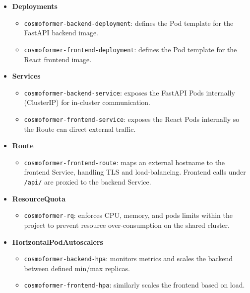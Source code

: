 \begin{itemize}
  \item \textbf{Deployments}
    \begin{itemize}
      \item \texttt{cosmoformer-backend-deployment}: defines the Pod template for the FastAPI backend image.
      \item \texttt{cosmoformer-frontend-deployment}: defines the Pod template for the React frontend image.
    \end{itemize}
    
  \item \textbf{Services}
    \begin{itemize}
      \item \texttt{cosmoformer-backend-service}: exposes the FastAPI Pods internally (ClusterIP) for in-cluster communication.
      \item \texttt{cosmoformer-frontend-service}: exposes the React Pods internally so the Route can direct external traffic.
    \end{itemize}

  \item \textbf{Route}
    \begin{itemize}
      \item \texttt{cosmoformer-frontend-route}: maps an external hostname to the frontend Service, handling TLS and load-balancing. Frontend calls under \texttt{/api/} are proxied to the backend Service.
    \end{itemize}

  \item \textbf{ResourceQuota}
    \begin{itemize}
      \item \texttt{cosmoformer-rq}: enforces CPU, memory, and pods limits within the project to prevent resource over-consumption on the shared cluster.
    \end{itemize}

  \item \textbf{HorizontalPodAutoscalers}
    \begin{itemize}
      \item \texttt{cosmoformer-backend-hpa}: monitors metrics and scales the backend between defined min/max replicas.
      \item \texttt{cosmoformer-frontend-hpa}: similarly scales the frontend based on load.
    \end{itemize}
\end{itemize}

